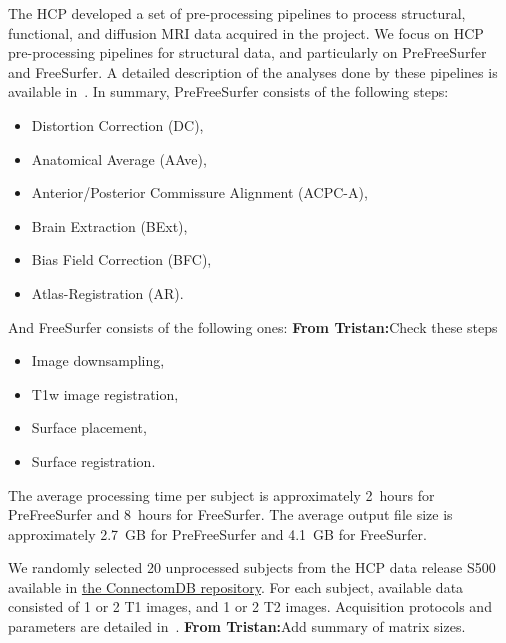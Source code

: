 \documentclass[a4paper,num-refs]{oup-contemporary}
\newcommand{\tristan}[1]{\color{blue}\textbf{From Tristan:}#1\color{black}}
\begin{document}
The HCP developed a set of pre-processing pipelines to process structural,
functional, and diffusion MRI data acquired in the project. We focus on HCP
pre-processing pipelines for structural data, and particularly
on PreFreeSurfer and FreeSurfer. 
A detailed description of the analyses done by these
pipelines is available in~\cite{glasser2013}. 
In summary, PreFreeSurfer consists of the following steps: 
\begin{itemize}
\item Distortion Correction (DC), 
\item Anatomical Average (AAve), 
\item Anterior/Posterior Commissure Alignment (ACPC-A), 
\item Brain Extraction (BExt), 
\item Bias Field Correction (BFC), 
\item Atlas-Registration (AR).
\end{itemize}
And FreeSurfer consists of the following ones: \tristan{Check these steps}
\begin{itemize}
\item Image downsampling, 
\item T1w image registration, 
\item Surface placement, 
\item Surface registration.
\end{itemize}
The average processing time per subject is approximately 2~hours for
PreFreeSurfer and 8~hours for FreeSurfer. The average output file size is
approximately 2.7~GB for PreFreeSurfer and 4.1~GB for FreeSurfer.

We randomly selected 20 unprocessed subjects 
from the HCP data release S500 
available in \href{https://db.humanconnectome.org}{the ConnectomDB repository}. 
For each subject, available data consisted of 1 or 2 T1 images, and 1 or 2 T2 images. 
Acquisition protocols and parameters are detailed in~\cite{van2013wu}. \tristan{Add summary of matrix sizes.}

\end{document}
